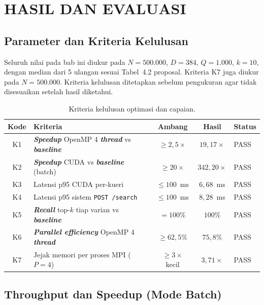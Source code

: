 \documentclass[12pt,a4paper,oneside]{report}
\newcommand{\keyword}[1]{\textbf{\textit{#1}}}
\newcommand{\pass}{\textcolor{green!45!black}{PASS}}
\begin{document}
\chapter{HASIL DAN EVALUASI}

\section{Parameter dan Kriteria Kelulusan}

Seluruh nilai pada bab ini diukur pada $N=500.000$, $D=384$, $Q=1.000$, $k=10$, dengan median dari 5 ulangan sesuai Tabel~4.2 proposal. Kriteria K7 juga diukur pada $N=500.000$. Kriteria kelulusan ditetapkan sebelum pengukuran agar tidak disesuaikan setelah hasil diketahui.

\begin{table}[H]
\centering
\caption{Kriteria kelulusan optimasi dan capaian.}
\label{tab:kpi}
{\small
\begin{tabularx}{\linewidth}{@{}c X c c l@{}}
\toprule
\textbf{Kode} & \textbf{Kriteria} & \textbf{Ambang} & \textbf{Hasil} & \textbf{Status}\\
\midrule
K1 & \keyword{Speedup} OpenMP 4 \keyword{thread} vs \keyword{baseline} & $\geq 2{,}5\times$ & $19{,}17\times$ & \pass\\
K2 & \keyword{Speedup} CUDA vs \keyword{baseline} (batch) & $\geq 20\times$ & $342{,}20\times$ & \pass\\
K3 & Latensi p95 CUDA per-kueri & $\leq 100$~ms & $6{,}68$~ms & \pass\\
K4 & Latensi p95 sistem \texttt{POST /search} & $\leq 100$~ms & $8{,}28$~ms & \pass\\
K5 & \keyword{Recall} top-$k$ tiap varian vs \keyword{baseline} & $=100\%$ & $100\%$ & \pass\\
K6 & \keyword{Parallel efficiency} OpenMP 4 \keyword{thread} & $\geq 62{,}5\%$ & $75{,}8\%$ & \pass\\
K7 & Jejak memori per proses MPI ($P=4$) & $\geq 3\times$ kecil & $3{,}71\times$ & \pass\\
\bottomrule
\end{tabularx}
}
\end{table}

\section{Throughput dan Speedup (Mode Batch)}
\end{document}
